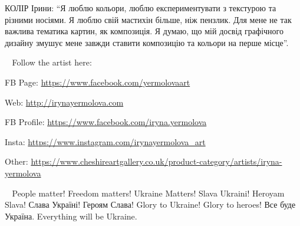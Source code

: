КОЛІР Ірини: \enquote{Я люблю кольори, люблю експериментувати з текстурою та різними
носіями. Я люблю свій мастихін більше, ніж пензлик. Для мене не так важлива
тематика картин, як композиція. Я думаю, що мій досвід графічного дизайну
змушує мене завжди ставити композицію та кольори на перше місце}.

💙💛 Follow the artist here:

FB Page: \url{https://www.facebook.com/yermolovaart}  

Web: \url{http://irynayermolova.com}

FB Profile: \url{https://www.facebook.com/iryna.yermolova}

Insta: \url{https://www.instagram.com/irynayermolova_art}

Other: \url{https://www.cheshireartgallery.co.uk/product-category/artists/iryna-yermolova}

💙💛 People matter! Freedom matters! Ukraine Matters! Slava Ukraini! Heroyam
Slava! Слава Україні! Героям Слава! Glory to Ukraine! Glory to heroes! Все буде
Україна. Everything will be Ukraine.
